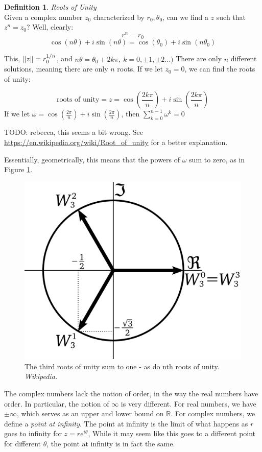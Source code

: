 \documentclass{article}
\theoremstyle{definition}
\newtheorem{definition}{Definition}[section]
\newcommand{\Def}[2]{
\begin{shaded*}
\begin{definition}{\textit{#1}}\\#2\end{definition}
\end{shaded*}
}
\def\R{\mathbb{R}}
\begin{document}
\Def{Roots of Unity}{Given a complex number $z_0$ characterized by $r_0, \theta_0$, can we find a $z$ such that $z^n = z_0$? Well, clearly:
$$r^n = r_0$$
$$\cos(n\theta) + i \sin(n\theta) = \cos(\theta_0) + i \sin(n\theta_0)$$

This, $\norm{z} = r_0^{1/n}$, and $n\theta = \theta_0 + 2k\pi,\ k = 0, \pm 1, \pm 2...)$ There are only $n$ different solutions, meaning there are only $n$ roots. If we let $z_0 = 0$, we can find the roots of unity:

$$\text{roots of unity} = z = \cos(\frac{2k\pi}{n}) + i \sin(\frac{2k\pi}{n})$$
If we let $\omega = \cos(\frac{2\pi}{n}) + i \sin(\frac{2\pi}{n})$, then $\sum_{k=0}^{n-1} \omega^k = 0$

TODO: rebecca, this seems a bit wrong. See \href{https://en.wikipedia.org/wiki/Root_of_unity}{https://en.wikipedia.org/wiki/Root\_of\_unity} for a better explanation.

Essentially, geometrically, this means that the powers of $\omega$ sum to zero, as in Figure \ref{fig:3rdrootsofunity}.

\begin{figure}[H]
	\centering
	\includegraphics[width=0.5\linewidth]{3rd_roots_of_unity}
	\caption{The third roots of unity sum to one - as do nth roots of unity. \textit{Wikipedia.}}
	\label{fig:3rdrootsofunity}
\end{figure}

}

The complex numbers lack the notion of order, in the way the real numbers have order. In particular, the notion of $\infty$ is very different. For real numbers, we have $\pm \infty$, which serves as an upper and lower bound on $\R$. For complex numbers, we define a \textit{point at infinity}. The point at infinity is the limit of what happens as $r$ goes to infinity for $z=r e^{i\theta}$, While it may seem like this goes to a different point for different $\theta$, the point at infinity is in fact the same.
\end{document}
